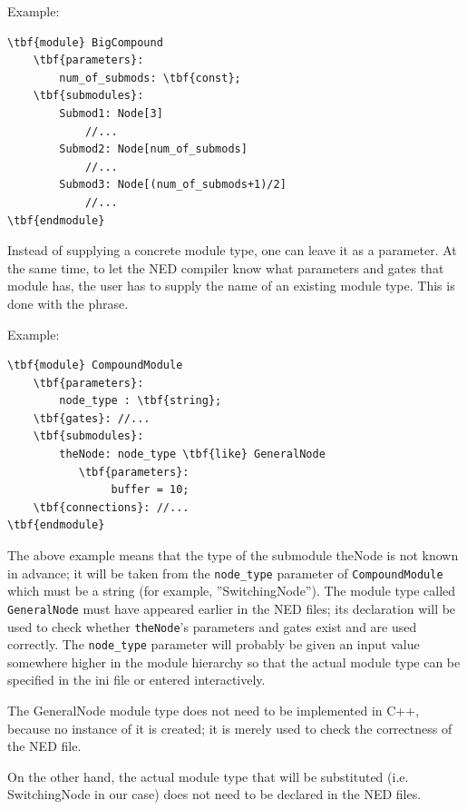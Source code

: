 Example:

\begin{Verbatim}[commandchars=\\\{\}]
\tbf{module} BigCompound
    \tbf{parameters}:
        num_of_submods: \tbf{const};
    \tbf{submodules}:
        Submod1: Node[3]
            //...
        Submod2: Node[num_of_submods]
            //...
        Submod3: Node[(num_of_submods+1)/2]
            //...
\tbf{endmodule}
\end{Verbatim}



Instead of supplying a concrete module type, one can leave it as a
parameter. At the same time, to let the NED compiler know what
parameters and gates that module has, the user has to supply the name
of an existing module type. This is done with the
 phrase.

Example:


\begin{Verbatim}[commandchars=\\\{\}]
\tbf{module} CompoundModule
    \tbf{parameters}:
        node_type : \tbf{string};
    \tbf{gates}: //...
    \tbf{submodules}:
        theNode: node_type \tbf{like} GeneralNode
           \tbf{parameters}:
                buffer = 10;
    \tbf{connections}: //...
\tbf{endmodule}
\end{Verbatim}

The above example means that the type of the submodule theNode is not
known in advance; it will be taken from the \texttt{node\_type}
parameter of \texttt{CompoundModule} which must be a string (for
example, ''SwitchingNode''). The module type called
\texttt{GeneralNode} must have appeared earlier in the NED files; its
declaration will be used to check whether \texttt{theNode}'s
parameters and gates exist and are used correctly. The
\texttt{node\_type} parameter will probably be given an input value
somewhere higher in the module hierarchy so that the actual module
type can be specified in the ini file or entered interactively.

The GeneralNode module type does not need to be implemented in
C++, because no instance of it is created; it is merely used
to check the correctness of the NED file.

On the other hand, the actual module type that will be substituted
(i.e. SwitchingNode in our case) does not need to be declared
in the NED files.

